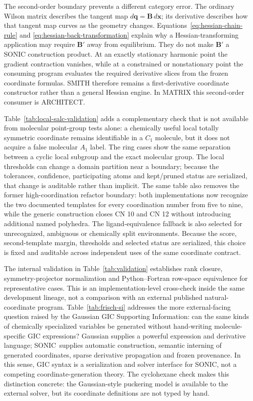 \documentclass[journal=jctcce,manuscript=article,layout=traditional]{achemso}
\newcommand{\SONIC}{SONIC}
\newcommand{\Bmat}{\mathbf{B}}
\theoremstyle{definition}
\begin{document}
The second-order boundary prevents a different category error.  The ordinary
Wilson matrix describes the tangent map
\(d\mathbf q=\Bmat\,d\mathbf x\); its derivative describes how that tangent map
curves as the geometry changes.  Equations~\eqref{eq:hessian-chain-rule} and
\eqref{eq:hessian-back-transformation} explain why a Hessian-transforming
application may require \(\Bmat'\) away from equilibrium.  They do not make
\(\Bmat'\) a SONIC construction product.  At an exactly stationary harmonic
point the gradient contraction vanishes, while at a constrained or
nonstationary point the consuming program evaluates the required derivative
slices from the frozen coordinate formulas.  SMITH therefore remains a
first-derivative coordinate constructor rather than a general Hessian engine.
In MATRIX this second-order consumer is ARCHITECT.

Table~\ref{tab:local-salc-validation} adds a complementary check that is not
available from molecular point-group tests alone: a chemically useful local
totally symmetric coordinate remains identifiable in a \(C_1\) molecule, but
it does not acquire a false molecular \(A_1\) label.  The ring cases show the
same separation between a cyclic local subgroup and the exact molecular group.
The local thresholds can change a domain partition near a boundary; because
the tolerances, confidence, participating atoms and kept/pruned status are
serialized, that change is auditable rather than implicit.
The same table also removes the former high-coordination refactor boundary:
both implementations now recognize the two documented templates for every
coordination number from five to nine, while the generic construction closes
CN 10 and CN 12 without introducing additional named polyhedra.  The
ligand-equivalence fallback is also selected for unrecognized, ambiguous or
chemically split environments.  Because the score, second-template margin,
thresholds and selected status are serialized, this choice is fixed and
auditable across independent uses of the same coordinate contract.

The internal validation in Table~\ref{tab:validation} establishes rank closure,
symmetry-projector normalization and Python--Fortran row-space equivalence for
representative cases.  This is an implementation-level cross-check inside
the same development lineage, not a comparison with an external published
natural-coordinate program.  Table~\ref{tab:frisch-si} addresses the more
external-facing question raised by the Gaussian GIC Supporting Information: can
the same kinds of chemically specialized variables be generated without
hand-writing molecule-specific GIC expressions?  Gaussian supplies a powerful
expression and derivative language; \SONIC\ supplies automatic construction,
semantic interning of generated coordinates, sparse derivative propagation and
frozen provenance.  In this sense, GIC syntax is a serialization and solver
interface for \SONIC, not a competing coordinate-generation theory.  The
cyclohexane check makes this distinction concrete: the Gaussian-style puckering
model is available to the external solver, but its coordinate definitions are
not typed by hand.
\end{document}
